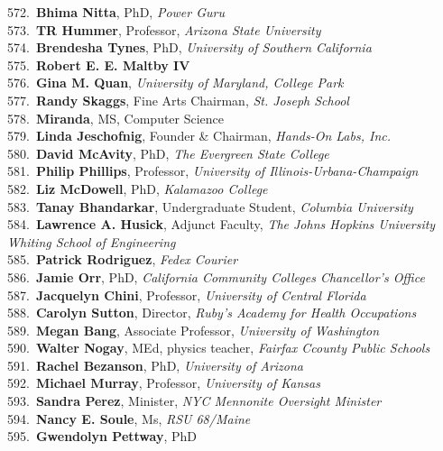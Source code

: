 572.~{\bf Bhima Nitta}, PhD, {\sl Power Guru} \\
573.~{\bf TR Hummer}, Professor, {\sl Arizona State University} \\
574.~{\bf Brendesha Tynes}, PhD, {\sl University of Southern California} \\
575.~{\bf Robert E. E. Maltby IV} \\
576.~{\bf Gina M. Quan}, {\sl University of Maryland, College Park} \\
577.~{\bf Randy Skaggs}, Fine Arts Chairman, {\sl St. Joseph School} \\
578.~{\bf Miranda}, MS, Computer Science \\
579.~{\bf Linda Jeschofnig}, Founder \& Chairman, {\sl Hands-On Labs, Inc.} \\
580.~{\bf David McAvity}, PhD, {\sl The Evergreen State College} \\
581.~{\bf Philip Phillips}, Professor, {\sl University of Illinois-Urbana-Champaign} \\
582.~{\bf Liz McDowell}, PhD, {\sl Kalamazoo College} \\
583.~{\bf Tanay Bhandarkar}, Undergraduate Student, {\sl Columbia University } \\
584.~{\bf Lawrence A. Husick}, Adjunct Faculty, {\sl The Johns Hopkins University Whiting School of Engineering} \\
585.~{\bf Patrick Rodriguez}, {\sl Fedex Courier} \\
586.~{\bf Jamie Orr}, PhD, {\sl California Community Colleges Chancellor's Office} \\
587.~{\bf Jacquelyn Chini}, Professor, {\sl University of Central Florida } \\
588.~{\bf Carolyn Sutton}, Director, {\sl Ruby's Academy for Health Occupations} \\
589.~{\bf Megan Bang}, Associate Professor, {\sl University of Washington} \\
590.~{\bf Walter Nogay}, MEd, physics teacher, {\sl Fairfax Ccounty Public Schools} \\
591.~{\bf Rachel Bezanson}, PhD, {\sl University of Arizona} \\
592.~{\bf Michael Murray}, Professor, {\sl University of Kansas} \\
593.~{\bf Sandra Perez}, Minister, {\sl NYC Mennonite Oversight Minister} \\
594.~{\bf Nancy E. Soule}, Ms, {\sl RSU 68/Maine} \\
595.~{\bf Gwendolyn Pettway}, PhD \\
